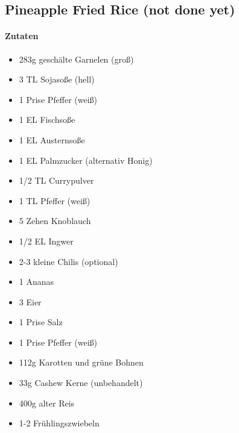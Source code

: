 \newpage
\subsection{Pineapple Fried Rice (not done yet)}
\paragraph{Zutaten}
\begin{itemize}[noitemsep]
	\item 283g geschälte Garnelen (groß)
	\item 3 TL Sojasoße (hell)
	\item 1 Prise Pfeffer (weiß)
	\item 1 EL Fischsoße
	\item 1 EL Austernsoße
	\item 1 EL Palmzucker (alternativ Honig)
	\item 1/2 TL Currypulver
	\item 1 TL Pfeffer (weiß)
	\item 5 Zehen Knoblauch 
	\item 1/2 EL Ingwer 
	\item 2-3 kleine Chilis (optional)
	\item 1 Ananas
	\item 3 Eier
	\item 1 Prise Salz
	\item 1 Prise Pfeffer (weiß)
	\item 112g Karotten und grüne Bohnen
	\item 33g Cashew Kerne (unbehandelt)
	\item 400g alter Reis
	\item 1-2 Frühlingszwiebeln 
\end{itemize}

